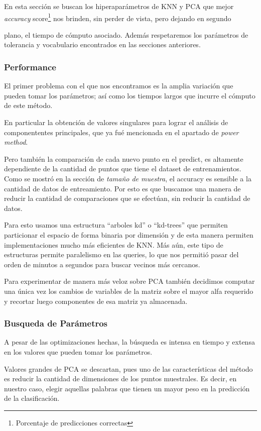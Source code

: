 En esta sección se buscan los hiperaparámetros de KNN y PCA que mejor
\emph{accuracy} score\footnote{Porcentaje de predicciones correctas} nos brinden, sin perder de vista, pero dejando en segundo

plano, el tiempo de cómputo asociado. Además respetaremos los
parámetros de tolerancia y vocabulario encontrados en las secciones
anteriores.

\subsubsection{Performance}

El primer problema con el que nos encontramos es la amplia variación
que pueden tomar los parámetros; así como los tiempos largos que
incurre el cómputo de este método.

En particular la obtención de valores singulares para lograr el
análisis de componententes principales, que ya fué mencionada en el
apartado de \emph{power method}.

Pero también la comparación de cada nuevo punto en el predict, es
altamente dependiente de la cantidad de puntos que tiene el dataset de
entrenamientos. Como se mostró en la sección de \emph{tamaño de
  muestra}, el accuracy es sensible a la cantidad de datos de
entreamiento. Por esto es que buscamos una manera de reducir la
cantidad de comparaciones que se efectúan, sin reducir la cantidad de
datos.

Para esto usamos una estructura ``arboles kd'' o ``kd-trees'' que
permiten particionar el espacio de forma binaria por dimensión y de
esta manera permiten implementaciones mucho más eficientes de KNN. Más aún, este
tipo de estructuras permite paralelismo en las queries, lo que nos permitió
pasar del orden de minutos a segundos para buscar vecinos más cercanos.

Para experimentar de manera más veloz sobre PCA también decidimos computar una
única vez los cambios de variables de la matriz sobre el mayor alfa requerido
y recortar luego componentes de esa matriz ya almacenada.

\subsubsection{Busqueda de Parámetros}

A pesar de las optimizaciones hechas, la búsqueda es intensa en tiempo
y extensa en los valores que pueden tomar los parámetros.

Valores grandes de PCA se descartan, pues uno de las características
del método es reducir la cantidad de dimensiones de los puntos
muestrales. Es decir, en nuestro caso, elegir aquellas palabras que
tienen un mayor peso en la predicción de la clasificación.


